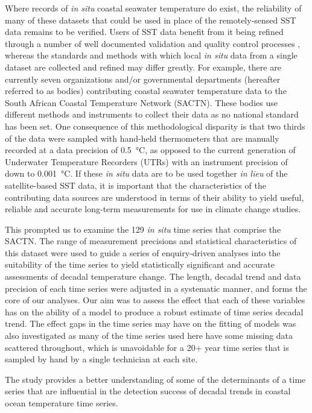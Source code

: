 \documentclass[]{ametsoc}
\begin{document}
Where records of \emph{in situ} coastal seawater temperature do exist, the reliability of many of these datasets that could be used in place of the remotely-sensed SST data remains to be verified. Users of SST data benefit from it being refined through a number of well documented validation and quality control processes \citep[\emph{e.g.}][]{Reynolds1994, Brown1999, Martin2012}, whereas the standards and methods with which local \emph{in situ} data from a single dataset are collected and refined may differ greatly. For example, there are currently seven organizations and/or governmental departments (hereafter referred to as bodies) contributing coastal seawater temperature data to the South African Coastal Temperature Network (SACTN). These bodies use different methods and instruments to collect their data as no national standard has been set. One consequence of this methodological disparity is that two thirds of the data were sampled with hand-held thermometers that are manually recorded at a data precision of \SI{0.5}{\degreeCelsius}, as opposed to the current generation of Underwater Temperature Recorders (UTRs) with an instrument precision of down to \SI{0.001}{\degreeCelsius}. If these \emph{in situ} data are to be used together \emph{in lieu} of the satellite-based SST data, it is important that the characteristics of the contributing data sources are understood in terms of their ability to yield useful, reliable and accurate long-term measurements for use in climate change studies.

This prompted us to examine the 129 \emph{in situ} time series that comprise the SACTN. The range of measurement precisions and statistical characteristics of this dataset were used to guide a series of enquiry-driven analyses into the suitability of the time series to yield statistically significant and accurate assessments of decadal temperature change. The length, decadal trend and data precision of each time series were adjusted in a systematic manner, and forms the core of our analyses. Our aim was to assess the effect that each of these variables has on the ability of a model to produce a robust estimate of time series decadal trend. The effect gaps in the time series may have on the fitting of models was also investigated as many of the time series used here have some missing data scattered throughout, which is unavoidable for a 20+ year time series that is sampled by hand by a single technician at each site.

The study provides a better understanding of some of the determinants of a time series that are influential in the detection success of decadal trends in coastal ocean temperature time series.
\end{document}
